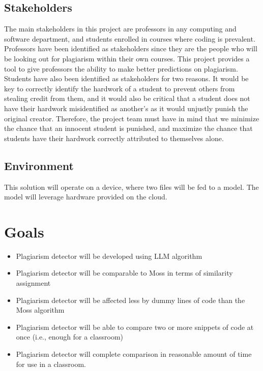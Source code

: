 \documentclass{article}
\begin{document}

\subsection{Stakeholders}
The main stakeholders in this project are professors in any computing and software department, and students enrolled in courses where coding is prevalent. Professors have been identified as stakeholders since they are the people who will be looking out for plagiarism within their own courses. This project provides a tool to give professors the ability to make better predictions on plagiarism. Students have also been identified as stakeholders for two reasons. It would be key to correctly identify the hardwork of a student to prevent others from stealing credit from them, and it would also be critical that a student does not have their hardwork misidentified as another's as it would unjustly punish the original creator. Therefore, the project team must have in mind that we minimize the chance that an innocent student is punished, and maximize the chance that students have their hardwork correctly attributed to themselves alone.

\subsection{Environment}
This solution will operate on a device, where two files will be fed to a model. The model will leverage hardware provided on the cloud.



\section{Goals}
\begin{itemize}
    \item Plagiarism detector will be developed using LLM algorithm
    \item Plagiarism detector will be comparable to Moss in terms of similarity assignment
    \item Plagiarism detector will be affected less by dummy lines of code than the Moss algorithm
    \item Plagiarism detector will be able to compare two or more snippets of code at once (i.e., enough for a classroom)
    \item Plagiarism detector will complete comparison in reasonable amount of time for use in a classroom.
  \end{itemize}
 
\end{document}
